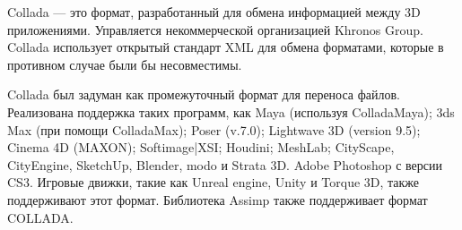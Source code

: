 Collada — это формат, разработанный для обмена  информацией между 3D приложениями.
Управляется некоммерческой организацией Khronos Group. Collada использует открытый стандарт XML для обмена форматами, которые в противном случае были бы несовместимы.

\medskip
Collada был задуман как промежуточный формат для переноса файлов.
Реализована поддержка таких программ, как Maya (используя ColladaMaya); 3ds Max (при помощи ColladaMax); Poser (v.7.0); Lightwave 3D (version 9.5); Cinema 4D (MAXON); Softimage|XSI; Houdini; MeshLab; CityScape, CityEngine, SketchUp, Blender, modo и Strata 3D.
Adobe Photoshop с версии CS3.
Игровые движки, такие как Unreal engine, Unity и Torque 3D, также поддерживают этот формат.
Библиотека Assimp также поддерживает формат COLLADA.
